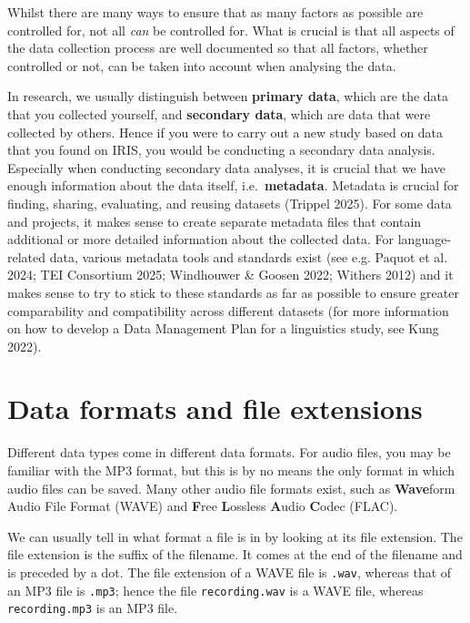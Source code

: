 \documentclass[
  letterpaper,
  DIV=11,
  numbers=noendperiod]{scrreprt}
\begin{document}
Whilst there are many ways to ensure that as many factors as possible
are controlled for, not all \emph{can} be controlled for. What is
crucial is that all aspects of the data collection process are well
documented so that all factors, whether controlled or not, can be taken
into account when analysing the data.

In research, we usually distinguish between \textbf{primary data}, which
are the data that you collected yourself, and \textbf{secondary data},
which are data that were collected by others. Hence if you were to carry
out a new study based on data that you found on IRIS, you would be
conducting a secondary data analysis. Especially when conducting
secondary data analyses, it is crucial that we have enough information
about the data itself, i.e.~\textbf{metadata}. Metadata is crucial for
finding, sharing, evaluating, and reusing datasets (Trippel 2025). For
some data and projects, it makes sense to create separate metadata files
that contain additional or more detailed information about the collected
data. For language-related data, various metadata tools and standards
exist (see e.g. Paquot et al. 2024; TEI Consortium 2025; Windhouwer \&
Goosen 2022; Withers 2012) and it makes sense to try to stick to these
standards as far as possible to ensure greater comparability and
compatibility across different datasets (for more information on how to
develop a Data Management Plan for a linguistics study, see Kung 2022).

\section{Data formats and file extensions}\label{sec-FileExtensions}

Different data types come in different data formats. For audio files,
you may be familiar with the MP3 format, but this is by no means the
only format in which audio files can be saved. Many other audio file
formats exist, such as \textbf{Wave}form Audio File Format (WAVE) and
\textbf{F}ree \textbf{L}ossless \textbf{A}udio \textbf{C}odec (FLAC).

We can usually tell in what format a file is in by looking at its file
extension. The file extension is the suffix of the filename. It comes at
the end of the filename and is preceded by a dot. The file extension of
a WAVE file is \texttt{.wav}, whereas that of an MP3 file is
\texttt{.mp3}; hence the file \texttt{recording.wav} is a WAVE file,
whereas \texttt{recording.mp3} is an MP3 file.
\end{document}
